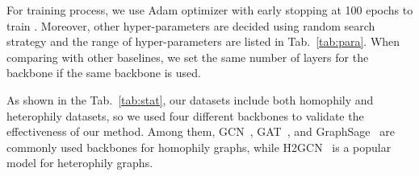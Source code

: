  For training process, we use Adam optimizer with early stopping at 100 epochs to train \model. 
Moreover, other hyper-parameters are decided using random search strategy and the range of hyper-parameters are listed in Tab.~\ref{tab:para}. When comparing with other baselines, we set the same number of layers for the backbone if the same backbone is used.


As shown in the Tab.~\ref{tab:stat}, our datasets include both homophily and heterophily datasets, so we used four different backbones to validate the effectiveness of our method.
Among them, GCN~\citep{kipf2017semisupervised}, GAT~\citep{velivckovic2017graph}, and GraphSage~\citep{hamilton2017inductive} are commonly used backbones for homophily graphs, while H2GCN~\citep{zhu2020beyond} is a popular model for heterophily graphs.


\begin{table}[h!]
\centering
\caption{The hyperparameter setting in this paper for all datasets}
\label{tab:para}
\end{table}





